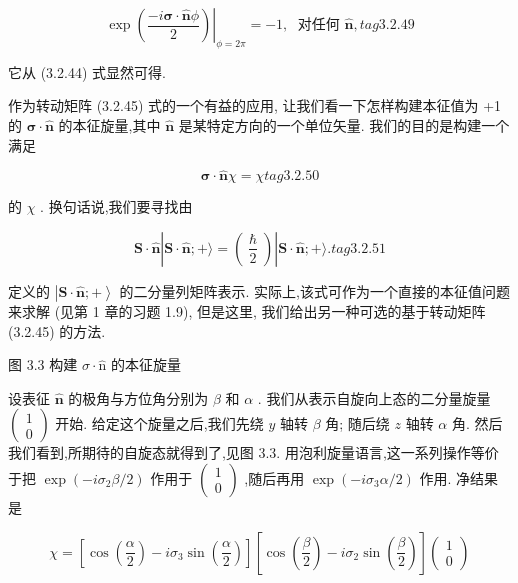 $$
{\left. \exp \left( \frac{-i\mathbf{\sigma } \cdot \widehat{\mathbf{n}}\phi }{2}\right) \right| }_{\phi = {2\pi }} = - 1,\;\text{ 对任何 }\widehat{\mathbf{n}}, tag{3.2.49}
$$

它从 (3.2.44) 式显然可得.

作为转动矩阵 (3.2.45) 式的一个有益的应用, 让我们看一下怎样构建本征值为 +1 的 $\mathbf{\sigma } \cdot \widehat{\mathbf{n}}$ 的本征旋量,其中 $\widehat{\mathbf{n}}$ 是某特定方向的一个单位矢量. 我们的目的是构建一个满足

$$
\mathbf{\sigma } \cdot \widehat{\mathbf{n}}\chi = \chi tag{3. 2.50}
$$

的 $\chi$ . 换句话说,我们要寻找由

$$
\mathbf{S} \cdot \widehat{\mathbf{n}}\left| {\mathbf{S} \cdot \widehat{\mathbf{n}}; + \rangle = \left( \frac{\hslash }{2}\right) }\right| \mathbf{S} \cdot \widehat{\mathbf{n}}; + \rangle . tag{3. 2.51}
$$

定义的 $\left| {\mathbf{S} \cdot \widehat{\mathbf{n}}; + }\right\rangle$ 的二分量列矩阵表示. 实际上,该式可作为一个直接的本征值问题来求解 (见第 1 章的习题 1.9), 但是这里, 我们给出另一种可选的基于转动矩阵 (3.2.45) 的方法.


图 3.3 构建 $\sigma \cdot \widehat{\mathrm{n}}$ 的本征旋量

设表征 $\widehat{\mathbf{n}}$ 的极角与方位角分别为 $\beta$ 和 $\alpha$ . 我们从表示自旋向上态的二分量旋量 $\left( \begin{array}{l} 1 \\ 0 \end{array}\right)$ 开始. 给定这个旋量之后,我们先绕 $y$ 轴转 $\beta$ 角; 随后绕 $z$ 轴转 $\alpha$ 角. 然后我们看到,所期待的自旋态就得到了,见图 3.3. 用泡利旋量语言,这一系列操作等价于把 $\exp \left( {-i{\sigma }_{2}\beta /2}\right)$ 作用于 $\left( \begin{array}{l} 1 \\ 0 \end{array}\right)$ ,随后再用 $\exp \left( {-i{\sigma }_{3}\alpha /2}\right)$ 作用. 净结果是

$$
\chi = \left\lbrack {\cos \left( \frac{\alpha }{2}\right) - i{\sigma }_{3}\sin \left( \frac{\alpha }{2}\right) }\right\rbrack \left\lbrack {\cos \left( \frac{\beta }{2}\right) - i{\sigma }_{2}\sin \left( \frac{\beta }{2}\right) }\right\rbrack \left( \begin{array}{l} 1 \\ 0 \end{array}\right)
$$


